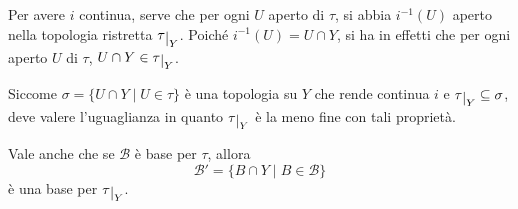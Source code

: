 \documentclass{article}
\begin{document}
\begin{oss}
    Per avere $i$ continua, serve che per ogni $U$ aperto di $\tau$, si abbia
    $i^{-1}(U)$ aperto nella topologia ristretta $\tau \restrict{Y}$. Poiché
    $i^{-1}(U) = U \cap Y$, si ha in effetti che per ogni aperto $U$ di $\tau$,
    $U \cap Y \in \tau \restrict{Y}$.

    Siccome $\sigma = \{U \cap Y \;|\; U \in \tau\}$ \`e una topologia su $Y$
    che rende continua $i$ e ${\tau\restrict{Y} \subseteq \sigma}$, deve valere
    l'uguaglianza in quanto $\tau\restrict{Y}$ \`e la meno fine con tali
    proprietà.
\end{oss}

\begin{oss}
    Vale anche che se $\mathcal{B}$ \`e base per $\tau$, allora
    \[
    \mathcal{B'} = \{B \cap Y \;|\; B \in \mathcal{B}\}
    \]
    \`e una base per $\tau\restrict{Y}$.
\end{oss}
\end{document}
